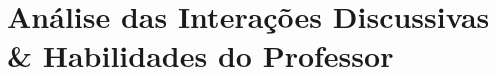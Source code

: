 \chapter[Interações Discussivas]{Análise das Interações Discussivas \& Habilidades do Professor}
\cite{MORTIMER:2002} \cite{SAMPSON:2006}
	